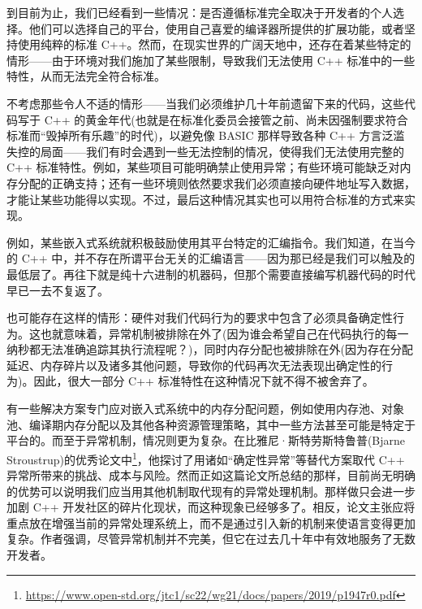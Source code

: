 到目前为止，我们已经看到一些情况：是否遵循标准完全取决于开发者的个人选择。他们可以选择自己的平台，使用自己喜爱的编译器所提供的扩展功能，或者坚持使用纯粹的标准 C++。然而，在现实世界的广阔天地中，还存在着某些特定的情形——由于环境对我们施加了某些限制，导致我们无法使用 C++ 标准中的一些特性，从而无法完全符合标准。

不考虑那些令人不适的情形——当我们必须维护几十年前遗留下来的代码，这些代码写于 C++ 的黄金年代(也就是在标准化委员会接管之前、尚未因强制要求符合标准而“毁掉所有乐趣”的时代)，以避免像 BASIC 那样导致各种 C++ 方言泛滥失控的局面——我们有时会遇到一些无法控制的情况，使得我们无法使用完整的 C++ 标准特性。例如，某些项目可能明确禁止使用异常；有些环境可能缺乏对内存分配的正确支持；还有一些环境则依然要求我们必须直接向硬件地址写入数据，才能让某些功能得以实现。不过，最后这种情况其实也可以用符合标准的方式来实现。

例如，某些嵌入式系统就积极鼓励使用其平台特定的汇编指令。我们知道，在当今的 C++ 中，并不存在所谓平台无关的汇编语言——因为那已经是我们可以触及的最低层了。再往下就是纯十六进制的机器码，但那个需要直接编写机器代码的时代早已一去不复返了。

也可能存在这样的情形：硬件对我们代码行为的要求中包含了必须具备确定性行为。这也就意味着，异常机制被排除在外了(因为谁会希望自己在代码执行的每一纳秒都无法准确追踪其执行流程呢？)，同时内存分配也被排除在外(因为存在分配延迟、内存碎片以及诸多其他问题，导致你的代码再次无法表现出确定性的行为)。因此，很大一部分 C++ 标准特性在这种情况下就不得不被舍弃了。

有一些解决方案专门应对嵌入式系统中的内存分配问题，例如使用内存池、对象池、编译期内存分配以及其他各种资源管理策略，其中一些方法甚至可能是特定于平台的。而至于异常机制，情况则更为复杂。在比雅尼·斯特劳斯特鲁普(Bjarne Stroustrup)的优秀论文中\footnote{\url{https://www.open-std.org/jtc1/sc22/wg21/docs/papers/2019/p1947r0.pdf}}，他探讨了用诸如“确定性异常”等替代方案取代 C++ 异常所带来的挑战、成本与风险。然而正如这篇论文所总结的那样，目前尚无明确的优势可以说明我们应当用其他机制取代现有的异常处理机制。那样做只会进一步加剧 C++ 开发社区的碎片化现状，而这种现象已经够多了。相反，论文主张应将重点放在增强当前的异常处理系统上，而不是通过引入新的机制来使语言变得更加复杂。作者强调，尽管异常机制并不完美，但它在过去几十年中有效地服务了无数开发者。

























